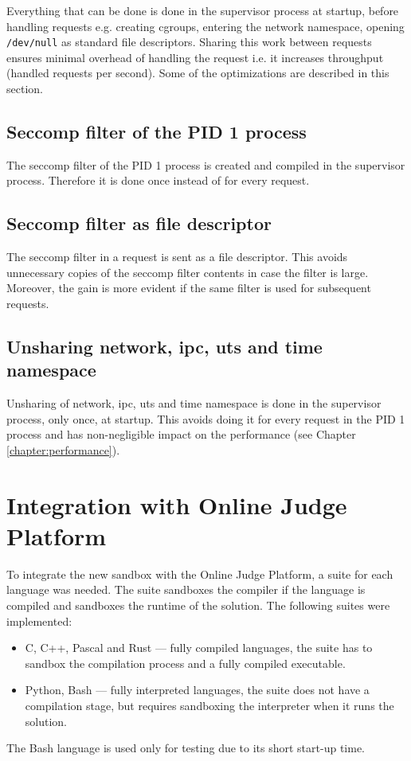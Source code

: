 \documentclass[en]{pracamgr}
\begin{document}
Everything that can be done is done in the supervisor process at startup, before handling requests e.g. creating cgroups, entering the network namespace, opening \texttt{/dev/null} as standard file descriptors. Sharing this work between requests ensures minimal overhead of handling the request i.e. it increases throughput (handled requests per second). Some of the optimizations are described in this section.

\subsection{Seccomp filter of the PID 1 process}

The seccomp filter of the PID 1 process is created and compiled in the supervisor process. Therefore it is done once instead of for every request.

\subsection{Seccomp filter as file descriptor}

The seccomp filter in a request is sent as a file descriptor. This avoids unnecessary copies of the seccomp filter contents in case the filter is large. Moreover, the gain is more evident if the same filter is used for subsequent requests.

\subsection{Unsharing network, ipc, uts and time namespace}

Unsharing of network, ipc, uts and time namespace is done in the supervisor process, only once, at startup. This avoids doing it for every request in the PID 1 process and has non-negligible impact on the performance (see Chapter \ref{chapter:performance}).

\section{Integration with Online Judge Platform}

To integrate the new sandbox with the Online Judge Platform, a suite for each language was needed. The suite sandboxes the compiler if the language is compiled and sandboxes the runtime of the solution. The following suites were implemented:

\begin{itemize}
    \item C, C++, Pascal and Rust --- fully compiled languages, the suite has to sandbox the compilation process and a fully compiled executable.
    \item Python, Bash --- fully interpreted languages, the suite does not have a compilation stage, but requires sandboxing the interpreter when it runs the solution.
\end{itemize}
The Bash language is used only for testing due to its short start-up time.
\end{document}
